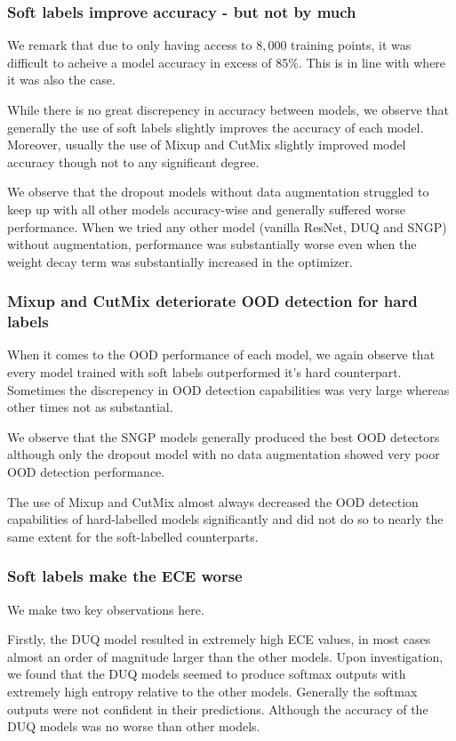 \documentclass{article}
\begin{document}
\subsubsection*{Soft labels improve accuracy - but not by much}
We remark that due to only having access to $8,000$ training points, it was difficult to acheive a model accuracy in excess of 85\%. This is in line with \cite{peterson2019humanuncertaintymakesclassification} where it was also the case.  

While there is no great discrepency in accuracy between models, we observe that generally the use of soft labels slightly improves the accuracy of each model. Moreover, usually the use of Mixup and CutMix slightly improved model accuracy though not to any significant degree. 

We observe that the dropout models without data augmentation struggled to keep up with all other models accuracy-wise and generally suffered worse performance. When we tried any other model (vanilla ResNet, DUQ and SNGP) without augmentation, performance was substantially worse even when the weight decay term was substantially increased in the optimizer.  
\subsubsection*{Mixup and CutMix deteriorate OOD detection for hard labels}
When it comes to the OOD performance of each model, we again observe that every model trained with soft labels outperformed it's hard counterpart. Sometimes the discrepency in OOD detection capabilities was very large whereas other times not as substantial. 

We observe that the SNGP models generally produced the best OOD detectors although only the dropout model with no data augmentation showed very poor OOD detection performance. 

The use of Mixup and CutMix almost always decreased the OOD detection capabilities of hard-labelled models significantly and did not do so to nearly the same extent for the soft-labelled counterparts.
\subsubsection*{Soft labels make the ECE worse}
We make two key observations here.

Firstly, the DUQ model resulted in extremely high ECE values, in most cases almost an order of magnitude larger than the other models. Upon investigation, we found that the DUQ models seemed to produce softmax outputs with extremely high entropy relative to the other models. Generally the softmax outputs were not confident in their predictions. Although the accuracy of the DUQ models was no worse than other models. 
\end{document}
